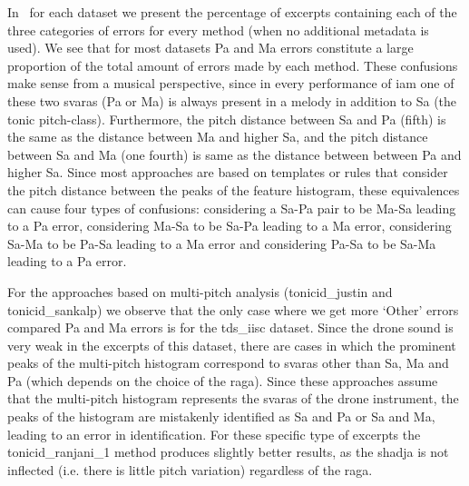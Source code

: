 {{In~ for each dataset we present the percentage of excerpts containing each of the three categories of errors for every method (when no additional metadata is used). We see that for most datasets Pa and Ma errors constitute a large proportion of the total amount of errors made by each method. These confusions make sense from a musical perspective, since in every performance of \gls{iam} one of these two \glspl{svara} (Pa or Ma) is always present in a melody in addition to Sa (the tonic pitch-class). Furthermore, the pitch distance between Sa and Pa (fifth) is
the same as the distance between Ma and higher Sa, and the pitch distance between Sa and Ma (one fourth) is same as the distance between between Pa and higher Sa. Since most approaches are based on templates or rules that consider the pitch distance between the peaks of the feature histogram, these equivalences can
cause four types of confusions: considering a Sa-Pa pair to be Ma-Sa leading to a Pa error, considering Ma-Sa to be Sa-Pa leading to a Ma error, considering
Sa-Ma to be Pa-Sa leading to a Ma error and considering Pa-Sa to be Sa-Ma leading to a Pa error.

For the approaches based on multi-pitch analysis (\acrshort{tonicid_justin} and \acrshort{tonicid_sankalp}) we observe that the only case where we get more `Other' errors compared Pa and Ma errors is for the \acrshort{tds_iisc} dataset. Since the drone sound is very weak in the excerpts of this dataset, there are cases in which the prominent peaks of the multi-pitch histogram correspond to \glspl{svara} other than Sa, Ma and Pa (which depends on the choice of the \gls{raga}). Since these approaches assume that the multi-pitch histogram represents the \glspl{svara} of the drone instrument, the peaks of the histogram are mistakenly identified as Sa and Pa or Sa and Ma, leading to an error in identification. For these specific type of excerpts the \acrshort{tonicid_ranjani_1} method produces slightly better results, as the \gls{shadja} is not inflected (i.e. there is little pitch variation) regardless of the \gls{raga}.

}}
